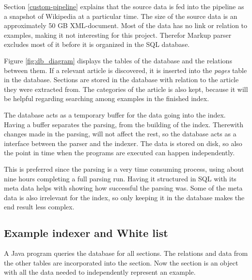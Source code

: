 Section \ref{custom-pipeline} explains that the source data is fed into the pipeline as a snapshot of Wikipedia at a particular time. The size of the source data is an approximately 50 GB XML-document. Most of the data has no link or relation to examples, making it not interesting for this project. Therefor Markup parser excludes most of it before it is organized in the SQL database. 

Figure \ref{fig:db_diagram} displays the tables of the database and the relations between them. If a relevant article is discovered, it is inserted into the \textit{pages} table in the database. Sections are stored in the database with relation to the article they were extracted from. The categories of the article is also kept, because it will be helpful regarding searching among examples in the finished index.  

The database acts as a temporary buffer for the data going into the index. Having a buffer separates the parsing, from the building of the index. Therewith changes made in the parsing, will not affect the rest, so the database acts as a interface between the parser and the indexer. The data is stored on disk, so also the point in time when the programs are executed can happen independently.

This is preferred since the parsing is a very time consuming process, using about nine hours completing a full parsing run. Having it structured in SQL with its meta data helps with showing how successful the parsing was. Some of the meta data is also irrelevant for the index, so only keeping it in the database  makes the end result less complex.


\subsection{Example indexer and White list} \label{imp_indexer}
A Java program queries the database for all sections. The relations and data from the other tables are incorporated into the section. Now the section is an object with all the data needed to independently represent an example.

